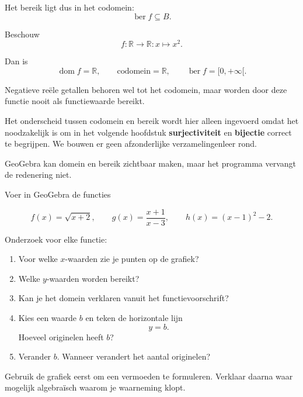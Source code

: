 \documentclass{ximera}
\begin{document}
Het bereik ligt dus in het codomein:
\[
\operatorname{ber}f\subseteq B.
\]

\begin{voorbeeld}
Beschouw
\[
f:\mathbb{R}\to\mathbb{R}:x\mapsto x^2.
\]

Dan is
\[
\operatorname{dom}f=\mathbb{R},
\qquad
\text{codomein}=\mathbb{R},
\qquad
\operatorname{ber}f=[0,+\infty[.
\]

Negatieve reële getallen behoren wel tot het codomein, maar worden door deze
functie nooit als functiewaarde bereikt.
\end{voorbeeld}

\begin{opmerking}
Het onderscheid tussen codomein en bereik wordt hier alleen ingevoerd omdat
het noodzakelijk is om in het volgende hoofdstuk \textbf{surjectiviteit} en
\textbf{bijectie} correct te begrijpen. We bouwen er geen afzonderlijke
verzamelingenleer rond.
\end{opmerking}



GeoGebra kan domein en bereik zichtbaar maken, maar het programma vervangt
de redenering niet.

\begin{fvdgeogebra}

    Voer in GeoGebra de functies
    
    \[
    f(x)=\sqrt{x+2},
    \qquad
    g(x)=\frac{x+1}{x-3},
    \qquad
    h(x)=(x-1)^2-2.
    \]
    
    Onderzoek voor elke functie:
    
    \begin{enumerate}
    
        \item Voor welke \(x\)-waarden zie je punten op de grafiek?
    
        \item Welke \(y\)-waarden worden bereikt?
    
        \item Kan je het domein verklaren vanuit het functievoorschrift?
    
        \item Kies een waarde \(b\) en teken de horizontale lijn
        \[
        y=b.
        \]
        Hoeveel originelen heeft \(b\)?
    
        \item Verander \(b\). Wanneer verandert het aantal originelen?
    
    \end{enumerate}
    
    Gebruik de grafiek eerst om een vermoeden te formuleren.
    Verklaar daarna waar mogelijk algebraïsch waarom je waarneming klopt.
    
    \end{fvdgeogebra}
\end{document}
